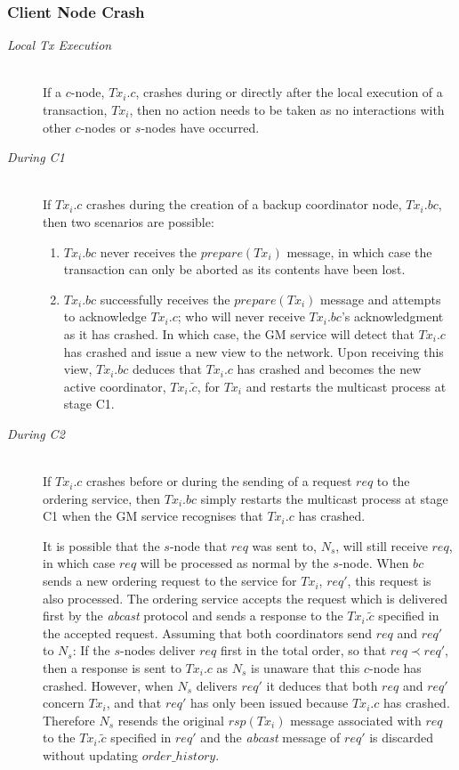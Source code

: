     \subsubsection*{Client Node Crash}
	\begin{description}
         \item[\emph{Local Tx Execution}]  \hfill \\
         If a $c$-node, $Tx_i.c$, crashes during or directly after the local execution of a transaction, $Tx_i$, then no action needs to be taken as no interactions with other $c$-nodes or $s$-nodes have occurred.  
		
		\item[\emph{During C1}]  \hfill \\
		If $Tx_i.c$ crashes during the creation of a backup coordinator node, $Tx_i.bc$, then two scenarios are possible:
		    \begin{enumerate}[label=\roman*]
			    \item    $Tx_i.bc$ never receives the $prepare(Tx_i)$ message, in which case the transaction  can only be aborted as its contents have been lost.  
			    \item    $Tx_i.bc$ successfully receives the $prepare(Tx_i)$ message and attempts to acknowledge $Tx_i.c$; who will never receive $Tx_i.bc$'s acknowledgment as it has crashed.  In which case, the GM service will detect that $Tx_i.c$ has crashed and issue a new view to the network.  Upon receiving this view, $Tx_i.bc$ deduces that $Tx_i.c$ has crashed and becomes the new active coordinator, $Tx_i.\tilde{c}$, for $Tx_i$ and restarts the multicast process at stage C1.  
		    \end{enumerate}     
		    
		\item[\emph{During C2}]  \hfill \\
        If $Tx_i.c$ crashes before or during the sending of a request $req$ to the ordering service, then $Tx_i.bc$ simply restarts the multicast process at stage C1 when the GM service recognises that $Tx_i.c$ has crashed.  
        
        It is possible that the $s$-node that $req$ was sent to, $N_s$, will still receive $req$, in which case $req$ will be processed as normal by the $s$-node.  When $bc$ sends a new ordering request to the service for $Tx_i$, $req'$, this request is also processed.  The ordering service accepts the request which is delivered first by the \emph{abcast} protocol and sends a response to the $Tx_i.\tilde{c}$ specified in the accepted request.  Assuming that both coordinators send $req$ and $req'$ to $N_s$: If the $s$-nodes deliver $req$ first in the total order, so that $req \prec req'$, then a response is sent to $Tx_i.c$ as $N_s$ is unaware that this $c$-node has crashed.  However, when $N_s$ delivers $req'$ it deduces that both $req$ and $req'$ concern $Tx_i$, and that $req'$ has only been issued because $Tx_i.c$ has crashed.  Therefore $N_s$ resends the original $rsp(Tx_i)$ message associated with $req$ to the $Tx_i.\tilde{c}$ specified in $req'$ and the \emph{abcast} message of $req'$ is discarded without updating $order\_history$.  
        

\end{description}
